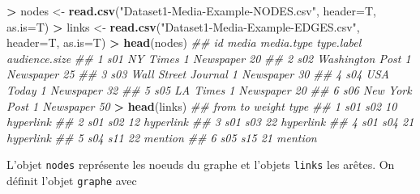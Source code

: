 \documentclass[]{book}
\newenvironment{Shaded}{\begin{snugshade}}{\end{snugshade}}
\newcommand{\CommentTok}[1]{\textcolor[rgb]{0.56,0.35,0.01}{\textit{#1}}}
\newcommand{\DataTypeTok}[1]{\textcolor[rgb]{0.13,0.29,0.53}{#1}}
\newcommand{\KeywordTok}[1]{\textcolor[rgb]{0.13,0.29,0.53}{\textbf{#1}}}
\newcommand{\NormalTok}[1]{#1}
\newcommand{\OperatorTok}[1]{\textcolor[rgb]{0.81,0.36,0.00}{\textbf{#1}}}
\newcommand{\StringTok}[1]{\textcolor[rgb]{0.31,0.60,0.02}{#1}}
\theoremstyle{definition}
\theoremstyle{definition}
\theoremstyle{definition}
\theoremstyle{remark}
\begin{document}
\begin{Shaded}
\begin{Highlighting}[]
\OperatorTok{>}\StringTok{ }\NormalTok{nodes <-}\StringTok{ }\KeywordTok{read.csv}\NormalTok{(}\StringTok{"Dataset1-Media-Example-NODES.csv"}\NormalTok{, }\DataTypeTok{header=}\NormalTok{T, }\DataTypeTok{as.is=}\NormalTok{T)}
\OperatorTok{>}\StringTok{ }\NormalTok{links <-}\StringTok{ }\KeywordTok{read.csv}\NormalTok{(}\StringTok{"Dataset1-Media-Example-EDGES.csv"}\NormalTok{, }\DataTypeTok{header=}\NormalTok{T, }\DataTypeTok{as.is=}\NormalTok{T)}
\OperatorTok{>}\StringTok{ }\KeywordTok{head}\NormalTok{(nodes)}
\CommentTok{##    id               media media.type type.label audience.size}
\CommentTok{## 1 s01            NY Times          1  Newspaper            20}
\CommentTok{## 2 s02     Washington Post          1  Newspaper            25}
\CommentTok{## 3 s03 Wall Street Journal          1  Newspaper            30}
\CommentTok{## 4 s04           USA Today          1  Newspaper            32}
\CommentTok{## 5 s05            LA Times          1  Newspaper            20}
\CommentTok{## 6 s06       New York Post          1  Newspaper            50}
\OperatorTok{>}\StringTok{ }\KeywordTok{head}\NormalTok{(links)}
\CommentTok{##   from  to weight      type}
\CommentTok{## 1  s01 s02     10 hyperlink}
\CommentTok{## 2  s01 s02     12 hyperlink}
\CommentTok{## 3  s01 s03     22 hyperlink}
\CommentTok{## 4  s01 s04     21 hyperlink}
\CommentTok{## 5  s04 s11     22   mention}
\CommentTok{## 6  s05 s15     21   mention}
\end{Highlighting}
\end{Shaded}

L'objet \texttt{nodes} représente les noeuds du graphe et l'objets \texttt{links} les arêtes. On définit l'objet \texttt{graphe} avec

\begin{Shaded}
\end{Shaded}
\end{document}

